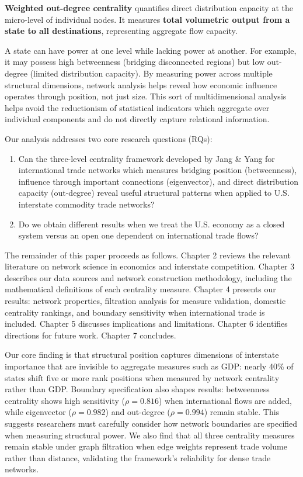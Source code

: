 \documentclass[12pt,oneside]{book}
\begin{document}
\textbf{Weighted out-degree centrality} quantifies direct distribution capacity at the micro-level of individual nodes. It measures \textbf{total volumetric output from a state to all destinations}, representing aggregate flow capacity.

A state can have power at one level while lacking power at another. For example, it may possess high betweenness (bridging disconnected regions) but low out-degree (limited distribution capacity). By measuring power across multiple structural dimensions, network analysis helps reveal how economic influence operates through position, not just size. This sort of multidimensional analysis helps avoid the reductionism of statistical indicators which aggregate over individual components and do not directly capture relational information.

Our analysis addresses two core research questions (RQs):

\begin{enumerate}
    \item[\textbf{RQ1:}] Can the three-level centrality framework developed by Jang \& Yang for international trade networks \cite{jang_network_2020, jang_measuring_2023} which measures bridging position (betweenness), influence through important connections (eigenvector), and direct distribution capacity (out-degree) reveal useful structural patterns when applied to U.S. interstate commodity trade networks?

    \item[\textbf{RQ2:}] Do we obtain different results when we treat the U.S. economy as a closed system versus an open one dependent on international trade flows?
\end{enumerate} 

The remainder of this paper proceeds as follows. Chapter 2 reviews the relevant literature on network science in economics and interstate competition. Chapter 3 describes our data sources and network construction methodology, including the mathematical definitions of each centrality measure. Chapter 4 presents our results: network properties, filtration analysis for measure validation, domestic centrality rankings, and boundary sensitivity when international trade is included. Chapter 5 discusses implications and limitations. Chapter 6 identifies directions for future work. Chapter 7 concludes.

Our core finding is that structural position captures dimensions of interstate importance that are invisible to aggregate measures such as GDP: nearly 40\% of states shift five or more rank positions when measured by network centrality rather than GDP. Boundary specification also shapes results: betweenness centrality shows high sensitivity ($\rho = 0.816$) when international flows are added, while eigenvector ($\rho = 0.982$) and out-degree ($\rho = 0.994$) remain stable. This suggests researchers must carefully consider how network boundaries are specified when measuring structural power. We also find that all three centrality measures remain stable under graph filtration when edge weights represent trade volume rather than distance, validating the framework's reliability for dense trade networks. 
\end{document}
